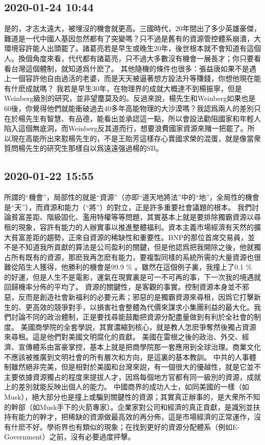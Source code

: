 \documentclass[twocolumn]{ctexart}
\begin{document}
\subsection*{2020-01-24 10:44}

是的，才志太遠大，被埋沒的機會就更高。三國時代，20年間出了多少英雄豪傑，難道是一代中國人基因忽然都有了突變嗎？只不過是舊有的資源管控體系崩潰，大環境容許能人出頭罷了。諸葛亮若是早生或晚生20年，後世根本就不會知道有這個人。換個角度來看，代代都有諸葛亮，只不過大多數沒有機會一展長才；你只要看看台灣這個體制，就知道爲什麽了。
其他隨機的條件也很多：張益唐如果不是遇上一個容許他自由過活的老婆，而是天天被逼著想方設法升等賺錢，你想他現在能有什麽成就嗎？
我若是早生30年，在物理界的成就大概達不到楊振寧，但是Weinberg級別的研究，並非望塵莫及的。反過來說，楊先生和Weinberg如果也是60後，你覺得他們就能衝破過去40多年高能物理的大沙漠嗎？我認爲兩人的差別只在於楊先生有智慧、有品德，能看出並承認這一點，所以會設法勸阻國家和年輕人陷入這個無底洞，而Weinberg反其道而行，想要浪費國家資源來賭一把罷了。所以現在高能所出來懟楊先生的，不是王貽芳這樣存心賣國求榮的混蛋，就是像當衆質問楊先生的研究生那樣自以爲遠遠强過楊的SB。
\subsection*{2020-01-22 15:55}

所謂的“機會”，局部性的就是“資源”（亦即“道天地將法”中的“地”，全局性的機會是“天”），而資源和能力（“將”）的對立，正是許多重要社會議題的根本。
我們討論貧富差距、階級固化、濫用特權等等問題，其實基本上就是要排除獨霸資源以尋租的現象，容許有能力的人辦實事以推進整體福利。資本主義市場經濟有天然的擴大貧富差距的趨勢，正來自資源的稀缺性和重要性。BNP的那位首席交易員，並不是不知道我所貢獻的算法是公司盈利的關鍵，但是他認爲把我開除之後，他就獨占所有既有的資源，那麽我再怎麽有能力，要複製同樣的系統所需的大量資源也很難從陌生人獲得，他勝利的機會是99.9 \% 。雖然在這個例子裏，我撞上了0.1 \% 的好運，但是人生不是電影，運氣在現實裏是可一不可再的事，下一次我的境遇就回歸機率分佈的平均了。
資源的關鍵性，是客觀的事實。控制資源本身並不邪惡，反而是創造社會新福利的必要元素；邪惡的是獨霸資源來尋租，因爲它打擊新生的、更高效的競爭對手，以損害社會整體為代價來謀求小集團利益的最大化。我們討論不同的政治體制，正是要找尋能鼓勵把資源分配盡量做到有利於全社會的制度。
美國商學院的全套學説，其實濃縮到核心，就是教人怎麽爭奪然後獨占資源來尋租。這是他們對美國文明腐化的貢獻。
美國在雷根之後的政治、外交、經濟、宣傳體系由富豪掌控，基本上就是把商學院那一套應用到全球治理。商業文化不應該被推廣到文明社會的所有層次和方向，是這裏的基本教訓。
中共的人事體制雖然絕非完美，但是相對於美國和台灣來説，有一個很大的優越性，就是它並不主要依據資源獨占的程度來提拔人才，因爲每個地方官都有同一級別的資源，成就上的差別就能反映出個人的能力。
中國商界的成功人士，如同美國的一樣（如Musk），絕大部分也是撞上或騙到關鍵性的資源；其實真正辦事的，是大衆所不知的幹部（如Musk手下的火箭專家）。企業家對公司和經濟的真正貢獻，是識別並扶持有能力的幹才，把稀缺的資源做最高效的再分佈，這是市場經濟的正常運作，沒有什麽不好。學術界也有類似的現象；在找到更好的資源分配體系（例如E-Government）之前，沒有必要過度抨擊。
\end{document}
